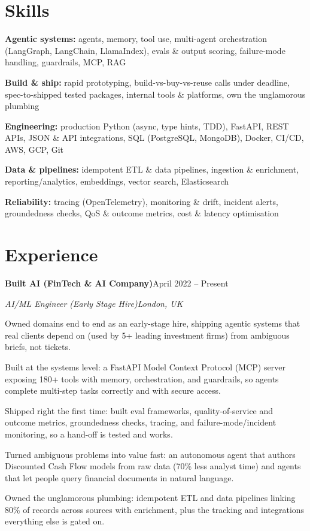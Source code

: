 \documentclass[10pt,a4paper]{article}
\newcommand{\entry}[4]{%
  {\color{company}\bfseries #1}\hfill {\color{muted}#2}\par
  \vspace{1pt}
  {\itshape #3}\hfill {\color{muted}\itshape #4}\par
  \vspace{3pt}%
}
\begin{document}
\section{Skills}
\begin{tight}
  \item[\textcolor{accent}{\small$\bullet$}] \textbf{Agentic systems:} agents, memory, tool use, multi-agent orchestration (LangGraph, LangChain, LlamaIndex), evals \& output scoring, failure-mode handling, guardrails, MCP, RAG
  \item[\textcolor{accent}{\small$\bullet$}] \textbf{Build \& ship:} rapid prototyping, build-vs-buy-vs-reuse calls under deadline, spec-to-shipped tested packages, internal tools \& platforms, own the unglamorous plumbing
  \item[\textcolor{accent}{\small$\bullet$}] \textbf{Engineering:} production Python (async, type hints, TDD), FastAPI, REST APIs, JSON \& API integrations, SQL (PostgreSQL, MongoDB), Docker, CI/CD, AWS, GCP, Git
  \item[\textcolor{accent}{\small$\bullet$}] \textbf{Data \& pipelines:} idempotent ETL \& data pipelines, ingestion \& enrichment, reporting/analytics, embeddings, vector search, Elasticsearch
  \item[\textcolor{accent}{\small$\bullet$}] \textbf{Reliability:} tracing (OpenTelemetry), monitoring \& drift, incident alerts, groundedness checks, QoS \& outcome metrics, cost \& latency optimisation
\end{tight}

\section{Experience}
\entry{Built AI (FinTech \& AI Company)}{April 2022 -- Present}{AI/ML Engineer (Early Stage Hire)}{London, UK}
\begin{tight}
  \item Owned domains end to end as an early-stage hire, shipping agentic systems that real clients depend on (used by 5+ leading investment firms) from ambiguous briefs, not tickets.
  \item Built at the systems level: a FastAPI Model Context Protocol (MCP) server exposing 180+ tools with memory, orchestration, and guardrails, so agents complete multi-step tasks correctly and with secure access.
  \item Shipped right the first time: built eval frameworks, quality-of-service and outcome metrics, groundedness checks, tracing, and failure-mode/incident monitoring, so a hand-off is tested and works.
  \item Turned ambiguous problems into value fast: an autonomous agent that authors Discounted Cash Flow models from raw data (70\% less analyst time) and agents that let people query financial documents in natural language.
  \item Owned the unglamorous plumbing: idempotent ETL and data pipelines linking 80\% of records across sources with enrichment, plus the tracking and integrations everything else is gated on.
\end{tight}
\end{document}

